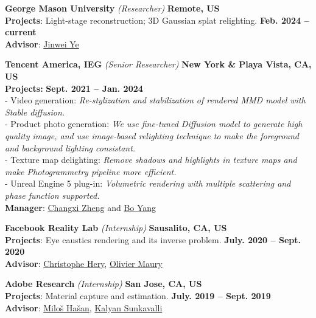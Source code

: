 \documentclass[margin,line]{resume}
\begin{document}
\begin{resume}
	\textbf{George Mason University} \textsl{(Researcher)} \hfill \textbf{Remote, US} \\
	\textbf{Projects}: Light-stage reconstruction; 3D Gaussian splat relighting. \hfill \textbf{Feb. 2024 -- current}\\
	\textbf{Advisor}: \href{https://cs.gmu.edu/~jinweiye/}{Jinwei Ye}      
	
	\vspace{0.0mm}
	
	\textbf{Tencent America, IEG} \textsl{(Senior Researcher)} \hfill \textbf{New York \& Playa Vista, CA, US} \\
	\textbf{Projects:} \hfill \textbf{Sept. 2021 -- Jan. 2024}\\
	- Video generation: \textsl{Re-stylization and stabilization of rendered MMD model with Stable diffusion.} \\
	- Product photo generation: \textsl{We use fine-tuned Diffusion model to generate high quality image, and use image-based relighting technique to make the foreground and background lighting consistant.} \\
	- Texture map delighting: \textsl{Remove shadows and highlights in texture maps and make Photogrammetry pipeline more efficient.} \\
	- Unreal Engine 5 plug-in: \textsl{Volumetric rendering with multiple scattering and phase function supported.} \\
	\textbf{Manager}: \href{https://www.cs.columbia.edu/~cxz/}{Changxi Zheng} and  \href{https://sites.google.com/site/boyanghome/home}{Bo Yang}
	
	\vspace{0.0mm}

	\textbf{Facebook Reality Lab} \textsl{(Internship)} \hfill \textbf{Sausalito, CA, US} \\
	\textbf{Projects}: Eye caustics rendering and its inverse problem. \hfill \textbf{July. 2020 -- Sept. 2020}\\
	\textbf{Advisor}: \href{https://graphics.pixar.com/library/indexAuthorChristophe_Hery.html}{Christophe Hery}, \href{https://www.imdb.com/name/nm1436524/}{Olivier Maury}       

    \vspace{0.0mm}

	\textbf{Adobe Research} \textsl{(Internship)} \hfill \textbf{San Jose, CA, US} \\
	\textbf{Projects}: Material capture and estimation. \hfill \textbf{July. 2019 -- Sept. 2019}\\
	\textbf{Advisor}: \href{http://miloshasan.net/}{Milo\v{s} Ha\v{s}an}, \href{https://research.adobe.com/person/kalyan-sunkavalli/}{Kalyan Sunkavalli}       


\end{resume}
\end{document}

